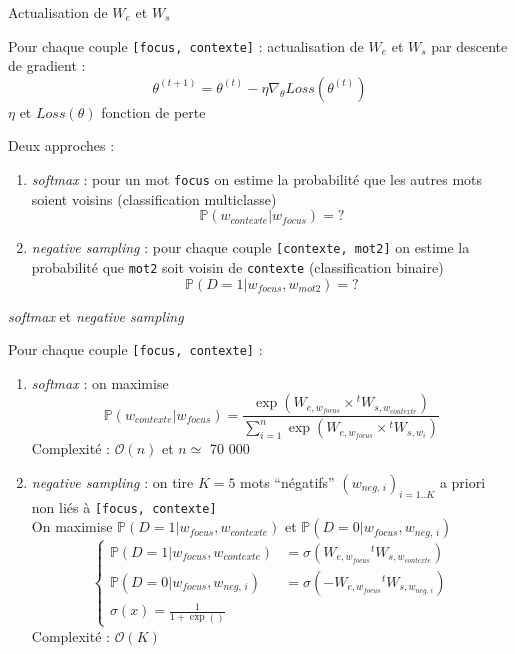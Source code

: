 \documentclass[10pt,xcolor=table,color={dvipsnames,usenames},ignorenonframetext,usepdftitle=false,french]{beamer}
\providecommand{\tightlist}{%
  \setlength{\parskip}{0pt}
  }
\begin{document}
\begin{frame}[fragile]{Actualisation de \(W_e\) et \(W_s\)}
\protect\hypertarget{actualisation-de-w_e-et-w_s}{}

Pour chaque couple \texttt{{[}focus,\ contexte{]}} : actualisation de
\(W_e\) et \(W_s\) par descente de gradient : \[
\theta^{(t+1)} = \theta^{(t)} - \eta \nabla_\theta Loss(\theta^{(t)})
\] \(\eta\)  et \(Loss(\theta)\)
fonction de perte

\pause

Deux approches :

\begin{enumerate}
[1.]
\tightlist
\item
  \emph{softmax} : pour un mot \texttt{focus} on estime la probabilité
  que les autres mots soient voisins (classification multiclasse) \[
  \mathbb P(w_{contexte}\vert w_{focus}) = ?
  \] \pause
\item
  \emph{negative sampling} : pour chaque couple
  \texttt{{[}contexte,\ mot2{]}} on estime la probabilité que
  \texttt{mot2} soit voisin de \texttt{contexte} (classification
  binaire) \[
  \mathbb P(D=1\vert w_{focus},w_{mot2}) = ?
  \]
\end{enumerate}

\end{frame}

\begin{frame}[fragile]{\emph{softmax} et \emph{negative sampling}}
\protect\hypertarget{softmax-et-negative-sampling-1}{}

Pour chaque couple \texttt{{[}focus,\ contexte{]}} :

\begin{enumerate}
[1.]
\item
  \emph{softmax} : on maximise \[
  \mathbb P(w_{contexte}\vert w_{focus}) = 
  \frac{
  \exp(W_{e,w_{focus}}\times {}^tW_{s,w_{contexte}})
  }{
  \sum_{i=1}^n\exp(W_{e,w_{focus}}\times {}^tW_{s,w_{i}})
  }
  \] \bcsmmh Complexité : \(\mathcal O (n)\) et \(n\simeq\) 70 000
  \pause
\item
  \emph{negative sampling} : on tire \(K=5\) mots “négatifs”
  \((w_{neg,\,i})_{i=1..K}\) a priori non liés à
  \texttt{{[}focus,\ contexte{]}}\\
  On maximise \(\mathbb P(D=1\vert w_{focus},w_{contexte})\) et
  \(\mathbb P(D=0\vert w_{focus},w_{neg,\,i})\) \[
  \begin{cases}
  \mathbb P(D=1\vert w_{focus},w_{contexte})&=\sigma(W_{e,w_{focus}}{}^tW_{s,w_{contexte}})  \\
  \mathbb P(D=0\vert w_{focus},w_{neg,\,i})&=\sigma(-W_{e,w_{focus}}{}^tW_{s,w_{neg,\,i}}) 
  \\\sigma(x)=\frac{1}{1+\exp()}
  \end{cases}
  \] \bcsmbh Complexité : \(\mathcal O (K)\)
\end{enumerate}

\end{frame}
\end{document}
